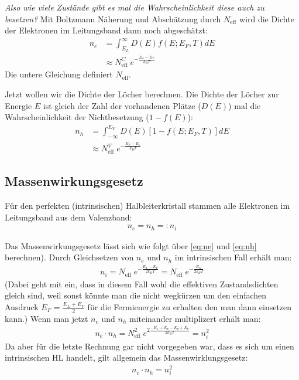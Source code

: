 \documentclass[paper=a4,10pt]{scrartcl}
\begin{document}
\textit{Also wie viele Zustände gibt es mal die Wahrscheinlichkeit diese auch zu besetzen?}
Mit Boltzmann Näherung und Abschätzung durch $N_{\text{eff}}$ wird die Dichte der Elektronen im Leitungsband dann noch abgeschätzt:
\begin{align}
n_e &= \int^{\infty}_{E_L} D(E) f(E; E_F, T) dE \label{eq:ne} \\ 
&\approx N^C_{\text{eff}} \;  e^{-\frac{E_L-E_F}{k_B T}} \label{eq:ne2}
\end{align}
Die untere Gleichung definiert $N_{\text{eff}}$.

Jetzt wollen wir die Dichte der Löcher berechnen. Die Dichte der Löcher zur Energie $E$ ist gleich der Zahl der vorhandenen Plätze ($D(E)$) mal die Wahrscheinlichkeit der Nichtbesetzung ($1-f(E)$):
\begin{align}
n_h &= \int_{-\infty}^{E_V} D(E) [1-f(E; E_F, T)] dE \label{eq:nh} \\
&\approx N^V_{\text{eff}} \;  e^{-\frac{E_F-E_V}{k_B T}} \label{eq:nh2}
\end{align}
\subsection{Massenwirkungsgesetz}
Für den perfekten (intrinsischen) Halbleiterkristall stammen alle Elektronen im Leitungsband aus dem Valenzband:
\begin{align}
n_e = n_h =: n_i
\end{align}

Das Massenwirkungsgesetz lässt sich wie folgt über \ref{eq:ne} und \ref{eq:nh} berechnen). Durch Gleichsetzen von $n_e$ und $n_h$ im intrinsischen Fall erhält man:
\begin{align}
n_i = N_{\text{eff}} \; e^{-\frac{E_L-E_V}{2k_BT}} = N_{\text{eff}} \; e^{-\frac{E_G}{2k_BT}}
\label{eq:intri_gleich}
\end{align}
(Dabei geht mit ein, dass in diesem Fall wohl die effektiven Zustandsdichten gleich sind, weil sonst könnte man die nicht wegkürzen um den einfachen Ausdruck $E_F = \frac{E_L + E_V}{2}$ für die Fermienergie zu erhalten den man dann einsetzen kann.)
Wenn man jetzt $n_e$ und $n_h$ miteinander multiplizert erhält man:
\begin{align}
n_e \cdot n_h = N^2_{\text{eff}} \; e^{2\frac{-E_L + E_F - E_F + E_V}{2k_BT}} = n_i^2
\end{align}
Da aber für die letzte Rechnung gar nicht vorgegeben war, dass es sich um einen intrinsischen HL handelt, gilt allgemein das Massenwirklungsgesetz:
\begin{align}
n_e \cdot n_h = n_i^2 \label{mwg}
\end{align}
\end{document}

